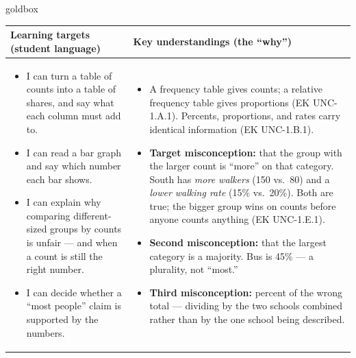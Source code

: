 \documentclass[10pt]{article}
\begin{document}
\renewcommand{\arraystretch}{1.4}
\boxguard
\begin{skillbox}{goldbox}
\begin{tabularx}{\linewidth}{@{}X|X@{}}
\textbf{Learning targets (student language)} & \textbf{Key understandings (the ``why'')} \\[2pt]
\hline
\vspace{-6pt}
\begin{itemize}[leftmargin=1.1em, nosep, after=\vspace{2pt}]
  \item I can turn a table of counts into a table of shares, and say what each column must
        add to.
  \item I can read a bar graph and say which number each bar shows.
  \item I can explain why comparing different-sized groups by counts is unfair --- and when a
        count is still the right number.
  \item I can decide whether a ``most people'' claim is supported by the numbers.
\end{itemize}
&
\vspace{-6pt}
\begin{itemize}[leftmargin=1.1em, nosep, after=\vspace{2pt}]
  \item A frequency table gives counts; a relative frequency table gives proportions
        (EK UNC-1.A.1). Percents, proportions, and rates carry identical information
        (EK UNC-1.B.1).
  \item \textbf{Target misconception:} that the group with the larger count is ``more'' on that
        category. South has \emph{more walkers} (150 vs.\ 80) and a \emph{lower walking rate}
        (15\% vs.\ 20\%). Both are true; the bigger group wins on counts before anyone counts
        anything (EK UNC-1.E.1).
  \item \textbf{Second misconception:} that the largest category is a majority. Bus is 45\% ---
        a plurality, not ``most.''
  \item \textbf{Third misconception:} percent of the wrong total --- dividing by the two schools
        combined rather than by the one school being described.
\end{itemize}
\end{tabularx}
\end{skillbox}
\end{document}
